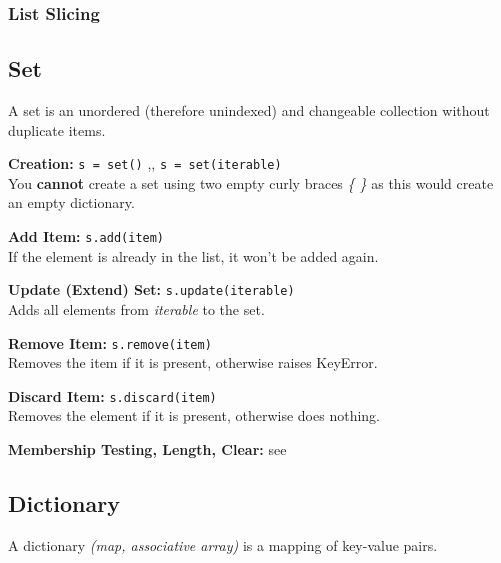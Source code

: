         \subsubsection{List Slicing} \label{List Slicing}

    \subsection{Set}
        A set is an unordered (therefore unindexed) and  changeable collection without duplicate
        items.

        \begin{indentblock}

            \textbf{Creation:} \texttt{s = set()} \sep{,}
            \texttt{s = set(iterable)} \\
            You \textbf{cannot} create a set using two empty curly braces \textit{\{ \}} as this would
            create an empty dictionary.

            \textbf{Add Item:} \texttt{s.add(item)} \\
            If the element is already in the list, it won't be added again.

            \textbf{Update (Extend) Set:} \texttt{s.update(iterable)} \\
            Adds all elements from \textit{iterable} to the set.

            \textbf{Remove Item:} \texttt{s.remove(item)} \\
            Removes the item if it is present, otherwise raises KeyError.

            \textbf{Discard Item:} \texttt{s.discard(item)} \\
            Removes the element if it is present, otherwise does nothing.

            \textbf{Membership Testing, Length, Clear:} see 

         \end{indentblock}

    \subsection{Dictionary}
        A dictionary \textit{(map, associative array)} is a mapping of key-value pairs.

